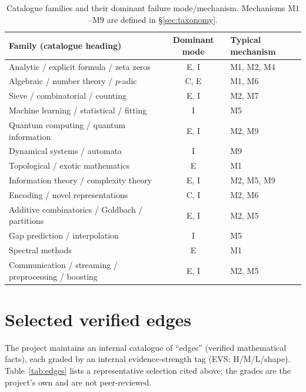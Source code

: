 \documentclass[11pt]{article}
\theoremstyle{plain}
\theoremstyle{definition}
\theoremstyle{remark}
\begin{document}
\begin{table}[h]
\centering
\footnotesize
\begin{tabular}{@{}p{6.7cm} c p{4.6cm}@{}}
\toprule
\textbf{Family (catalogue heading)} & \textbf{Dominant mode} & \textbf{Typical mechanism}\\
\midrule
Analytic / explicit formula / zeta zeros & E, I & M1, M2, M4 \\
Algebraic / number theory / $p$-adic & C, E & M1, M6 \\
Sieve / combinatorial / counting & E, I & M2, M7 \\
Machine learning / statistical / fitting & I & M5 \\
Quantum computing / quantum information & E, I & M2, M9 \\
Dynamical systems / automata & I & M9 \\
Topological / exotic mathematics & E & M1 \\
Information theory / complexity theory & E, I & M2, M5, M9 \\
Encoding / novel representations & C, I & M2, M6 \\
Additive combinatorics / Goldbach / partitions & E, I & M2, M5 \\
Gap prediction / interpolation & I & M5 \\
Spectral methods & E & M1 \\
Communication / streaming / preprocessing / boosting & E, I & M2, M5 \\
\bottomrule
\end{tabular}
\caption{Catalogue families and their dominant failure mode/mechanism. Mechanisms
$\mathrm{M1}$--$\mathrm{M9}$ are defined in \S\ref{sec:taxonomy}.}
\label{tab:families}
\end{table}

\section{Selected verified edges}
\label{app:edges}

The project maintains an internal catalogue of ``edges'' (verified mathematical
facts), each graded by an internal evidence-strength tag (\textsf{EVS}:
H/M/L/shape). Table~\ref{tab:edges} lists a representative selection cited above;
the grades are the project's own and are not peer-reviewed.
\end{document}
